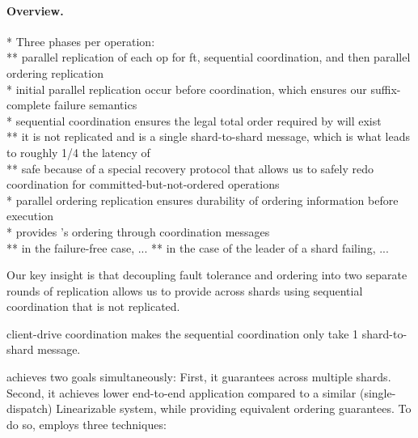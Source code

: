 \paragraph{\sys{} Overview.}
* Three phases per operation:\\
** parallel replication of each op for ft, sequential coordination, and then parallel ordering replication\\
* initial parallel replication occur before coordination, which ensures our suffix-complete failure semantics\\
* sequential coordination ensures the legal total order required by \mdl{} will exist\\
** it is not replicated and is a single shard-to-shard message, which is what leads to roughly 1/4 the latency of \sdl\\
** safe because of a special recovery protocol that allows us to safely redo coordination for committed-but-not-ordered operations\\
* parallel ordering replication ensures durability of ordering information before execution\\


* provides \mdl{}'s ordering through coordination messages\\
** in the failure-free case, ...
** in the case of the leader of a shard failing, ...


Our key insight is that decoupling fault tolerance and ordering into two separate rounds of replication allows us to provide \mdl{} across shards using sequential coordination that is not replicated.


client-drive coordination makes the sequential coordination only take 1 shard-to-shard message.






\sys{} achieves two goals simultaneously: First, it guarantees \mdl{} across
multiple shards. Second, it achieves lower end-to-end application compared to a
similar (single-dispatch) Linearizable system, while providing equivalent
ordering guarantees. To do so, \sys{} employs three techniques:


